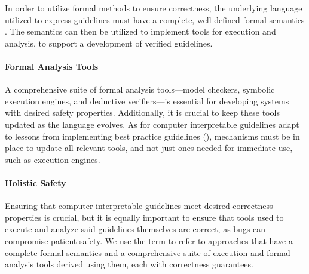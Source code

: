 In order to utilize formal methods to ensure \CDSS{} correctness,
the underlying language utilized to express guidelines must have
a complete, well-defined formal semantics \cite{ShaharAMIA96}. The
semantics can then be utilized to implement tools for execution and analysis,
to support a development of verified guidelines.

\paragraph{Formal Analysis Tools}

A comprehensive suite of formal analysis tools---model checkers,
symbolic execution engines, and deductive verifiers---is essential for
developing systems with desired safety properties.
Additionally, it is crucial to keep these tools updated as the language evolves.
As \DSLs{} for computer interpretable guidelines adapt
to lessons from implementing best practice guidelines (\BPGs{}),
mechanisms must be in place to update all relevant tools, and not just
ones needed for immediate use, such as execution engines.

\paragraph{Holistic Safety}

Ensuring that computer interpretable guidelines
meet desired correctness properties is crucial,
but it is equally important to ensure that tools used
to execute and analyze said guidelines themselves are correct,
as bugs can compromise patient safety.
We use the term  to refer to approaches that
have a complete formal semantics and a comprehensive suite of execution
and formal analysis tools derived using them,
each with correctness guarantees.

